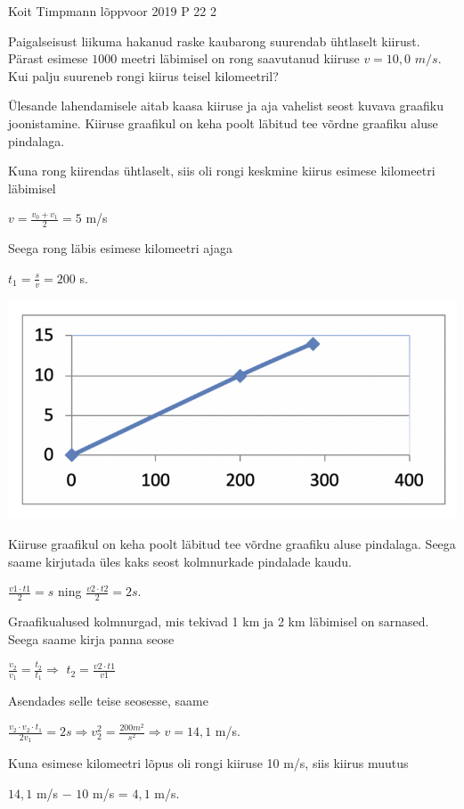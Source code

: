 {Koit Timpmann} %
{lõppvoor} %
{2019} %
{P 22} %
{2} %
{
\ifStatement
Paigalseisust liikuma hakanud raske kaubarong suurendab ühtlaselt kiirust. Pärast esimese $1000$ meetri läbimisel on rong saavutanud kiiruse $v = 10,0$ $m/s$. Kui palju suureneb rongi kiirus teisel kilomeetril?
\fi


\ifHint
Ülesande lahendamisele aitab kaasa kiiruse ja aja vahelist seost kuvava graafiku joonistamine. Kiiruse graafikul on keha poolt läbitud tee võrdne graafiku aluse pindalaga.
\fi

\ifSolution
Kuna rong kiirendas ühtlaselt, siis oli rongi keskmine kiirus esimese kilomeetri läbimisel
\begin{center}
$v = \frac{v_0 + v_1}{2} = 5$ m/s
\end{center}
Seega rong läbis esimese kilomeetri ajaga 
\begin{center}
$t_1 = \frac{s}{v} = 200$ s.
\end{center}
\begin{center}
	\includegraphics[width=0.5\linewidth]{2019-v3p-22-lah.PNG}
\end{center}
Kiiruse graafikul on keha poolt läbitud tee võrdne graafiku aluse pindalaga. Seega saame kirjutada üles kaks seost kolmnurkade pindalade kaudu.
\begin{center}
$\frac {v1 \cdot t1}{2} = s$ ning $\frac {v2 \cdot t2}{2} = 2s$.
\end{center}
Graafikualused kolmnurgad, mis tekivad 1 km ja 2 km läbimisel on sarnased. Seega saame kirja panna seose
\begin{center}
$\frac{v_2}{v_1} = \frac{t_2}{t_1} \Rightarrow $ $t_2 = \frac{v2 \cdot t1}{v1} $
\end{center}
Asendades selle teise seosesse, saame
\begin{center}
$\frac{v_2 \cdot v_2 \cdot t_1}{2 v_1} = 2s \Rightarrow v_2^2 = \frac{200 m^2}{s^2} \Rightarrow v = 14,1$ m/s. 
\end{center}
Kuna esimese kilomeetri lõpus oli rongi kiiruse 10 m/s, siis kiirus muutus
\begin{center}
$14,1$ m/s $-$ $10$ m/s = $4,1$ m/s.
\end{center}
\fi
}